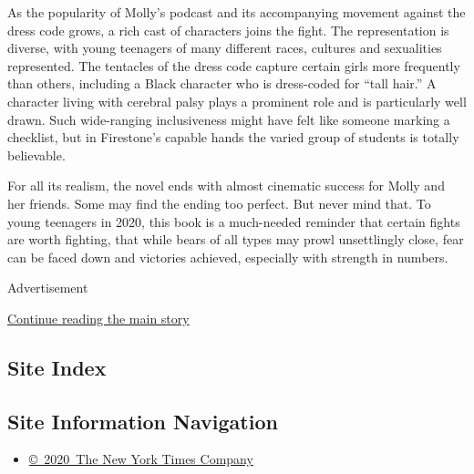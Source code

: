 As the popularity of Molly's podcast and its accompanying movement
against the dress code grows, a rich cast of characters joins the fight.
The representation is diverse, with young teenagers of many different
races, cultures and sexualities represented. The tentacles of the dress
code capture certain girls more frequently than others, including a
Black character who is dress-coded for ``tall hair.'' A character living
with cerebral palsy plays a prominent role and is particularly well
drawn. Such wide-ranging inclusiveness might have felt like someone
marking a checklist, but in Firestone's capable hands the varied group
of students is totally believable.

For all its realism, the novel ends with almost cinematic success for
Molly and her friends. Some may find the ending too perfect. But never
mind that. To young teenagers in 2020, this book is a much-needed
reminder that certain fights are worth fighting, that while bears of all
types may prowl unsettlingly close, fear can be faced down and victories
achieved, especially with strength in numbers.

Advertisement

\protect\hyperlink{after-bottom}{Continue reading the main story}

\hypertarget{site-index}{%
\subsection{Site Index}\label{site-index}}

\hypertarget{site-information-navigation}{%
\subsection{Site Information
Navigation}\label{site-information-navigation}}

\begin{itemize}
\tightlist
\item
  \href{https://help.nytimes3xbfgragh.onion/hc/en-us/articles/115014792127-Copyright-notice}{©~2020~The
  New York Times Company}
\end{itemize}

